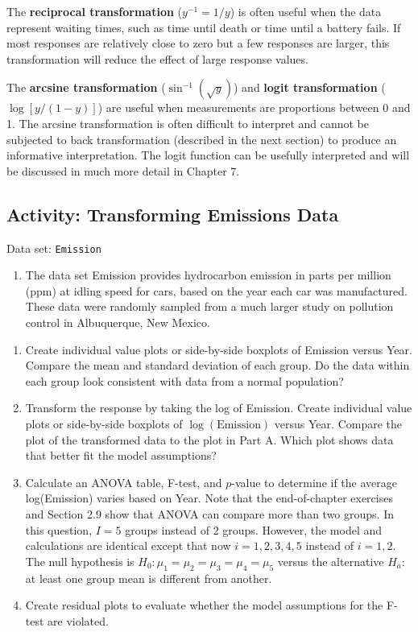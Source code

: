 \documentclass[
]{book}
\providecommand{\tightlist}{%
  \setlength{\itemsep}{0pt}\setlength{\parskip}{0pt}}
\begin{document}
The \textbf{reciprocal transformation} (\(y^{-1} = 1/y\)) is often useful when the data represent waiting times, such as time until death or time until a battery fails. If most responses are relatively close to zero but a few responses are larger, this transformation will reduce the effect of large response values.

The \textbf{arcsine transformation} (\(\sin^{-1}(\sqrt{y})\)) and \textbf{logit transformation} (\(\log[y/(1-y)]\)) are useful when measurements are proportions between 0 and 1. The arcsine transformation is often difficult to interpret and cannot be subjected to back transformation (described in the next section) to produce an informative interpretation. The logit function can be usefully interpreted and will be discussed in much more detail in Chapter 7.

\hypertarget{activity-transforming-emissions-data}{%
\subsection*{Activity: Transforming Emissions Data}\label{activity-transforming-emissions-data}}

Data set: \texttt{Emission}

\begin{enumerate}
\def\labelenumi{\arabic{enumi}.}
\setcounter{enumi}{30}
\tightlist
\item
  The data set Emission provides hydrocarbon emission in parts per million (ppm) at idling speed for cars, based on the year each car was manufactured. These data were randomly sampled from a much larger study on pollution control in Albuquerque, New Mexico.
\end{enumerate}

\begin{enumerate}
\def\labelenumi{\alph{enumi}.}
\item
  Create individual value plots or side-by-side boxplots of Emission versus Year. Compare the mean and standard deviation of each group. Do the data within each group look consistent with data from a normal population?
\item
  Transform the response by taking the log of Emission. Create individual value plots or side-by-side boxplots of \(\log(\text{Emission})\) versus Year. Compare the plot of the transformed data to the plot in Part A. Which plot shows data that better fit the model assumptions?
\item
  Calculate an ANOVA table, F-test, and \(p\)-value to determine if the average log(Emission) varies based on Year. Note that the end-of-chapter exercises and Section 2.9 show that ANOVA can compare more than two groups. In this question, \(I = 5\) groups instead of 2 groups. However, the model and calculations are identical except that now \(i = 1, 2, 3, 4, 5\) instead of \(i = 1, 2\). The null hypothesis is \(H_0\!:\! \mu_1 = \mu_2 = \mu_3 = \mu_4 = \mu_5\) versus the alternative \(H_a\!:\!\) at least one group mean is different from another.
\item
  Create residual plots to evaluate whether the model assumptions for the F-test are violated.
\end{enumerate}
\end{document}
